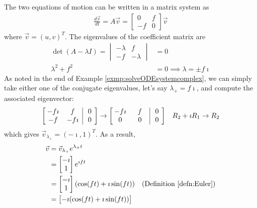\begin{solution}
The two equations of motion can be written in a matrix system as
\begin{align*}
\frac{d\vec{v}}{dt} = A\vec{v} =
\begin{bmatrix}
0 & f \\
-f & 0 
\end{bmatrix}
\vec{v}
\end{align*}
where $\vec{v} = (u,v)^T$. The eigenvalues of the coefficient matrix are
\begin{align*}
\det(A - \lambda I) = \begin{vmatrix}
-\lambda & f \\
-f & -\lambda
\end{vmatrix} &= 0 \\
\lambda^2 + f^2 &= 0 \implies \lambda = \pm f\imath 
\end{align*}
As noted in the end of Example \ref{exmp:solveODEsystemcomplex}, we can simply take either one of the conjugate eigenvalues, let's say $\lambda_+ = f\imath$, and compute the associated eigenvector:
\begin{align*}
\left[\begin{array}{@{\,}wc{18pt}wc{18pt}|wc{10pt}@{\,}}
-f\imath & f & 0 \\
-f & -f\imath & 0 \\
\end{array}\right] &\to
\left[\begin{array}{@{\,}wc{18pt}wc{18pt}|wc{10pt}@{\,}}
-f\imath & f & 0 \\
0 & 0 & 0 \\
\end{array}\right] & R_2 + \imath R_1 \to R_2
\end{align*}
which gives $\vec{v}_{\lambda_+} = (-\imath,1)^T$. As a result,
\begin{align*}
\vec{v} &= \vec{v}_{\lambda_+}e^{\lambda_+ t} \\
&= 
\begin{bmatrix}
-\imath \\
1
\end{bmatrix}
e^{\imath ft} \\
&= \begin{bmatrix}
-\imath \\
1
\end{bmatrix}
(\cos(ft) + \imath \sin(ft)) & \text{(Definition \ref{defn:Euler})}\\
&= 
\begin{bmatrix}
-\imath (\cos(ft) + \imath \sin(ft)) \\

\end{bmatrix}
\end{align*}
\end{solution}
